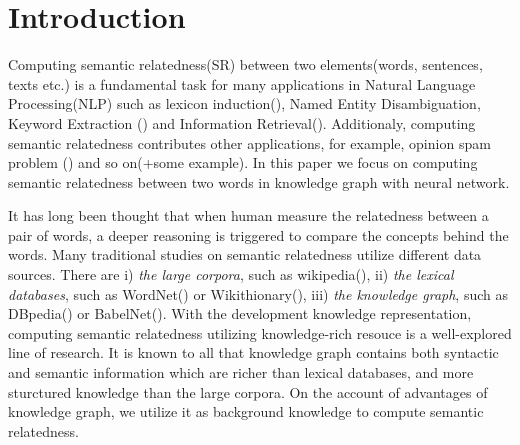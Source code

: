 \section{Introduction}
Computing semantic relatedness(SR) between two elements(words, sentences,
texts etc.) is a fundamental task for many applications in Natural Language
Processing(NLP) such as lexicon induction(\cite{aaai/QadirMGL15}), Named 
Entity Disambiguation{\cite{acl/HanZ10}}, Keyword Extraction
(\cite{ijcai/ZhangFW13}) and Information Retrieval(\cite{acl/GurevychMZ07}). 
Additionaly, computing semantic relatedness contributes other applications, 
for example, opinion spam problem (\cite{www/SandulescuE15}) and so on(+some example). 
In this paper we focus on computing semantic relatedness between two 
words in knowledge graph with neural network.

It has long been thought that when human measure the relatedness between
a pair of words, a deeper reasoning is triggered to compare the concepts
behind the words. Many traditional studies on semantic relatedness
utilize different data sources. There are
i) \emph{the large corpora}, such as wikipedia(\cite{ijcai/GabrilovichM07}), 
ii) \emph{the lexical databases}, such as WordNet(\cite{acl/Pucher07}) or Wikithionary(\cite{aaai/ZeschMG08}), 
iii) \emph{the knowledge graph}, such as DBpedia(\cite{aaai/NavigliP12}) or BabelNet(\cite{aaai/NavigliP12}).
With the development knowledge representation, computing semantic relatedness utilizing
knowledge-rich resouce is a well-explored line of research. It is known to all that
knowledge graph contains both syntactic and semantic information which are 
richer than lexical databases, and more sturctured knowledge than the large corpora.
On the account of advantages of knowledge graph, we utilize it as background 
knowledge to compute semantic relatedness.


